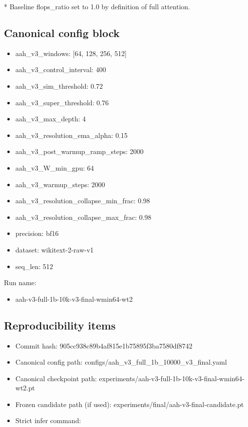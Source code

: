 \documentclass[11pt]{article}
\begin{document}
* Baseline flops_ratio set to 1.0 by definition of full attention.

\subsection{Canonical config block}
\begin{itemize}
\item aah_v3_windows: [64, 128, 256, 512]
\item aah_v3_control_interval: 400
\item aah_v3_sim_threshold: 0.72
\item aah_v3_super_threshold: 0.76
\item aah_v3_max_depth: 4
\item aah_v3_resolution_ema_alpha: 0.15
\item aah_v3_post_warmup_ramp_steps: 2000
\item aah_v3_W_min_gpu: 64
\item aah_v3_warmup_steps: 2000
\item aah_v3_resolution_collapse_min_frac: 0.98
\item aah_v3_resolution_collapse_max_frac: 0.98
\item precision: bf16
\item dataset: wikitext-2-raw-v1
\item seq_len: 512
\end{itemize}

Run name:
\begin{itemize}
\item aah-v3-full-1b-10k-v3-final-wmin64-wt2
\end{itemize}

\subsection{Reproducibility items}
\begin{itemize}
\item Commit hash: 905cc938c89b4af815e1b75895f3ba7580df8742
\item Canonical config path: configs/aah_v3_full_1b_10000_v3_final.yaml
\item Canonical checkpoint path: experiments/aah-v3-full-1b-10k-v3-final-wmin64-wt2.pt
\item Frozen candidate path (if used): experiments/final/aah-v3-final-candidate.pt
\item Strict infer command:
\end{itemize}
\end{document}
